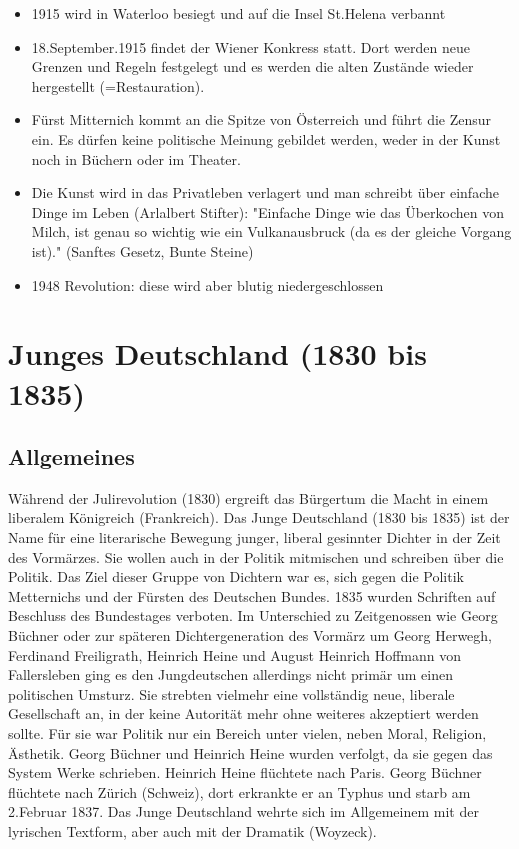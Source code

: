 \documentclass[12pt,a4paper]{article}
\begin{document}
	\begin{itemize}
	\item 1915 wird in Waterloo besiegt und auf die Insel St.Helena verbannt
	\item 18.September.1915 findet der Wiener Konkress statt. Dort werden neue Grenzen und Regeln festgelegt und es werden die alten Zustände
	wieder hergestellt (=Restauration).
	\item Fürst Mitternich kommt an die Spitze von Österreich und führt die Zensur ein. Es dürfen keine politische Meinung gebildet werden, weder in der Kunst noch in Büchern oder im Theater.
	\item Die Kunst wird in das Privatleben verlagert und man schreibt über einfache Dinge im Leben (Arlalbert Stifter): "Einfache Dinge wie das Überkochen von Milch, ist genau so wichtig wie ein Vulkanausbruck (da es der gleiche Vorgang ist)." (Sanftes Gesetz, Bunte Steine)

	\item 1948 Revolution: diese wird aber blutig niedergeschlossen	
	
	\end{itemize}
	
\newpage	
	
\section{Junges Deutschland (1830 bis 1835)}

\subsection{Allgemeines}
Während der Julirevolution (1830) ergreift das Bürgertum die Macht in einem liberalem Königreich (Frankreich). Das Junge Deutschland (1830 bis 1835) ist der Name für eine literarische Bewegung junger, liberal gesinnter Dichter in der Zeit des Vormärzes. Sie wollen auch in der Politik mitmischen und schreiben über die Politik. Das Ziel dieser Gruppe von Dichtern war es, sich gegen die Politik Metternichs und der Fürsten des Deutschen Bundes. 1835 wurden Schriften auf Beschluss des Bundestages verboten.
\newline
\newline
Im Unterschied zu Zeitgenossen wie Georg Büchner oder zur späteren Dichtergeneration des Vormärz um Georg Herwegh, Ferdinand Freiligrath, Heinrich Heine und August Heinrich Hoffmann von Fallersleben ging es den Jungdeutschen allerdings nicht primär um einen politischen Umsturz. Sie strebten vielmehr eine vollständig neue, liberale Gesellschaft an, in der keine Autorität mehr ohne weiteres akzeptiert werden sollte. Für sie war Politik nur ein Bereich unter vielen, neben Moral, Religion, Ästhetik.
\newline
\newline
Georg Büchner und Heinrich Heine wurden verfolgt, da sie gegen das System Werke schrieben. Heinrich Heine flüchtete nach Paris. Georg Büchner flüchtete nach Zürich (Schweiz), dort erkrankte er an Typhus und starb am 2.Februar 1837.
\newline
\newline
Das Junge Deutschland wehrte sich im Allgemeinem mit der lyrischen Textform, aber auch mit der Dramatik (Woyzeck).
\end{document}
